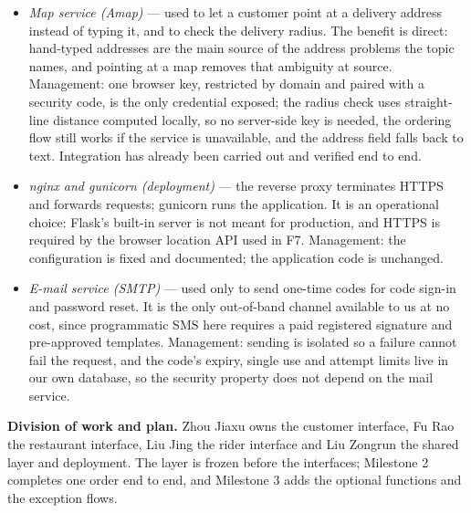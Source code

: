 \begin{itemize}
\item \emph{Map service (Amap)} --- used to let a customer point at a delivery address instead
of typing it, and to check the delivery radius. The benefit is direct: hand-typed addresses are
the main source of the address problems the topic names, and pointing at a map removes that
ambiguity at source. Management: one browser key, restricted by domain and paired with a security
code, is the only credential exposed; the radius check uses straight-line distance computed
locally, so no server-side key is needed, the ordering flow still works if the service is
unavailable, and the address field falls back to text. Integration has already been carried out and verified end to end.
\item \emph{nginx and gunicorn (deployment)} --- the reverse proxy terminates HTTPS and forwards
requests; gunicorn runs the application. It is an operational choice: Flask's built-in server is not meant for production, and HTTPS is
required by the browser location API used in F7. Management: the configuration is fixed and
documented; the application code is unchanged.
\item \emph{E-mail service (SMTP)} --- used only to send one-time codes for code sign-in and password reset.
It is the only out-of-band channel available to us at no cost, since programmatic SMS here
requires a paid registered signature and pre-approved templates. Management: sending is
isolated so a failure cannot fail the request, and the code's expiry, single use and attempt
limits live in our own database, so the security property does not depend on the mail service.
\end{itemize}


\noindent\textbf{Division of work and plan.} Zhou Jiaxu owns the customer interface, Fu Rao the
restaurant interface, Liu Jing the rider interface and Liu Zongrun the shared layer and
deployment. The layer is frozen before the interfaces; Milestone 2 completes one order end to
end, and Milestone 3 adds the optional functions and the exception flows.


